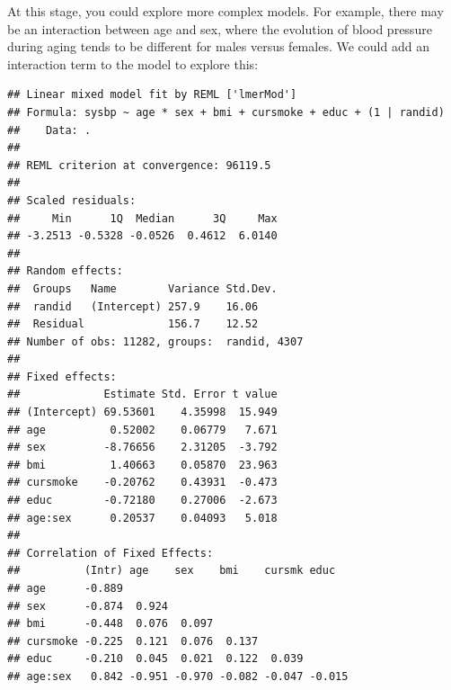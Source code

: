 \documentclass[
]{book}
\newenvironment{Shaded}{\begin{snugshade}}{\end{snugshade}}
\newcommand{\DataTypeTok}[1]{\textcolor[rgb]{0.13,0.29,0.53}{#1}}
\newcommand{\DecValTok}[1]{\textcolor[rgb]{0.00,0.00,0.81}{#1}}
\newcommand{\KeywordTok}[1]{\textcolor[rgb]{0.13,0.29,0.53}{\textbf{#1}}}
\newcommand{\NormalTok}[1]{#1}
\newcommand{\OperatorTok}[1]{\textcolor[rgb]{0.81,0.36,0.00}{\textbf{#1}}}
\newcommand{\StringTok}[1]{\textcolor[rgb]{0.31,0.60,0.02}{#1}}
\begin{document}
At this stage, you could explore more complex models. For example, there
may be an interaction between age and sex, where the evolution of blood pressure
during aging tends to be different for males versus females. We could add
an interaction term to the model to explore this:

\begin{Shaded}
\end{Shaded}

\begin{verbatim}
## Linear mixed model fit by REML ['lmerMod']
## Formula: sysbp ~ age * sex + bmi + cursmoke + educ + (1 | randid)
##    Data: .
## 
## REML criterion at convergence: 96119.5
## 
## Scaled residuals: 
##     Min      1Q  Median      3Q     Max 
## -3.2513 -0.5328 -0.0526  0.4612  6.0140 
## 
## Random effects:
##  Groups   Name        Variance Std.Dev.
##  randid   (Intercept) 257.9    16.06   
##  Residual             156.7    12.52   
## Number of obs: 11282, groups:  randid, 4307
## 
## Fixed effects:
##             Estimate Std. Error t value
## (Intercept) 69.53601    4.35998  15.949
## age          0.52002    0.06779   7.671
## sex         -8.76656    2.31205  -3.792
## bmi          1.40663    0.05870  23.963
## cursmoke    -0.20762    0.43931  -0.473
## educ        -0.72180    0.27006  -2.673
## age:sex      0.20537    0.04093   5.018
## 
## Correlation of Fixed Effects:
##          (Intr) age    sex    bmi    cursmk educ  
## age      -0.889                                   
## sex      -0.874  0.924                            
## bmi      -0.448  0.076  0.097                     
## cursmoke -0.225  0.121  0.076  0.137              
## educ     -0.210  0.045  0.021  0.122  0.039       
## age:sex   0.842 -0.951 -0.970 -0.082 -0.047 -0.015
\end{verbatim}
\end{document}
